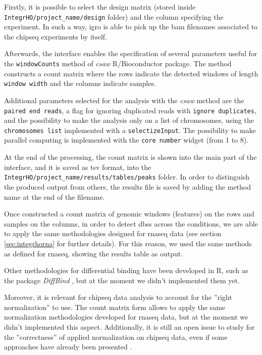 Firstly, it is possible to select the design matrix (stored inside \lstinline!IntegrHO/project_name/design! folder) and the column specifying the experiment.
In such a way, \gls{igro} is able to pick up the \gls{bam} filenames associated to the \gls{chipseq} experiments by itself.

Afterwards, the interface enables the specification of several parameters useful for the \lstinline!windowCounts! method of \textit{csaw} R/Bioconductor package.
The method constructs a count matrix where the rows indicate the detected windows of length \lstinline!window width! and the columns indicate samples.

Additional parameters selected for the analysis with the \textit{csaw} method are the \lstinline!paired end reads!, a flag for ignoring duplicated reads with \lstinline!ignore duplicates!, and the possibility to make the analysis only on a list of chromosomes, using the \lstinline!chromosomes list! implemented with a \lstinline!selectizeInput!.
The possibility to make parallel computing is implemented with the \lstinline!core number! widget (from 1 to 8).

At the end of the processing, the count matrix is shown into the main part of the interface, and it is saved as \gls{tsv} format, into the \lstinline!IntegrHO/project_name/results/tables/peaks! folder.
In order to distinguish the produced output from others, the results file is saved by adding the method name at the end of the filename.

Once constructed a count matrix of genomic windows (features) on the rows and samples on the columns, in order to detect \glspl{dbs} across the conditions, we are able to apply the same methodologies designed for \gls{rnaseq} data (see section \ref{sec:integrhorna} for further details).
For this reason, we used the same methods as defined for \gls{rnaseq}, showing the results table as output.

Other methodologies for differential binding have been developed in R, such as the package \textit{DiffBind} \cite{Ross-Innes2012}, but at the moment we didn't implemented them yet.

Moreover, it is relevant for \gls{chipseq} data analysis to account for the ''right normalization'' to use.
The count matrix form allows to apply the same normalization methodologies developed for \gls{rnaseq} data, but at the moment we didn't implemented this aspect.
Additionally, it is still an open issue to study for the ''correctness'' of applied normalization on \gls{chipseq} data, even if some approaches have already been presented \cite{Angelini2015}.


